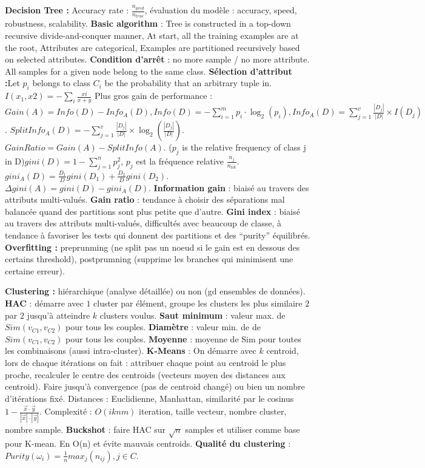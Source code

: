 \documentclass[9pt,a4paper]{report}
\begin{document}
\textbf{Decision Tree :} Accuracy rate : $\frac{n_{pred}}{n_{true}}$, évaluation du modèle : accuracy, speed, robustness, scalability. \textbf{Basic algorithm} : Tree is constructed in a top-down recursive divide-and-conquer manner, At start, all the training examples are at the root, Attributes are categorical, Examples are partitioned recursively based on selected attributes. \textbf{Condition d'arrêt} : no more sample / no more attribute. All samples for a given node belong to the same class. \textbf{Sélection d'attribut :}Let $p_i$ belongs to class $C_i$ be the probability that an arbitrary tuple in. $I(x_1, x2) = -\sum_i \frac{xi}{x+y}$ Plus gros gain de performance : $Gain(A)=Info(D)-Info_A(D), Info(D)=-\sum_{i=1}^mp_i\cdot\log_2(p_i), Info_A(D)=\sum_{j=1}^v\frac{|D_j|}{|D|}\times I(D_j)$. $SplitInfo_A(D)=-\sum_{j=1}^v\frac{|D_j|}{|D|}\times\log_2(\frac{|D_j|}{|D|})$. $GainRatio = Gain(A)-SplitInfo(A)$. ($p_j$ is the relative frequency of class j in D)$gini(D)=1-\sum_{j=1}^np^2_j$, $p_j$ est la fréquence relative $\frac{n_j}{n_{tot}}$. $gini_A(D)=\frac{D_1}{D}gini(D_1)+\frac{D_2}{D}gini(D_2)$. $\Delta gini(A)=gini(D)-gini_A(D)$.
\textbf{Information gain} : biaisé au travers des attributs multi-valués.
\textbf{Gain ratio} : tendance à choisir des séparations mal balancée quand des partitions sont plus petite que d’autre.
\textbf{Gini index} : biaisé au travers des attributs multi-valués, difficultés avec beaucoup de classe, à tendance à favoriser les tests qui donnent des partitions et des “purity” équilibrés.
\textbf{Overfitting :} preprunming (ne split pas un noeud si le gain est en dessous des certains threshold), postprumning (supprime les branches qui minimisent une certaine erreur).

\textbf{Clustering :} hiérarchique (analyse détaillée) ou non (gd ensembles de données). \textbf{HAC} : démarre avec $1$ cluster par élément, groupe les clusters les plus similaire $2$ par $2$ jusqu'à atteindre $k$ clusters voulus. \textbf{Saut minimum} : valeur max. de $Sim(v_{C1}, v_{C2})$ pour tous les couples. \textbf{Diamètre} : valeur min. de de $Sim(v_{C1}, v_{C2})$ pour tous les couples. \textbf{Moyenne} :  moyenne de Sim pour toutes les combinaisons (aussi intra-cluster). \textbf{K-Means} : On démarre avec $k$ centroid, lors de chaque itérations on fait : attribuer chaque point au centroid le plus proche, recalculer le centre des centroids (vecteurs moyen des distances aux centroid). Faire jusqu'à convergence (pas de centroid changé) ou bien un nombre d'itérations fixé. Distances : Euclidienne, Manhattan, similarité par le cosinus $1-\frac{\vec{x}\cdot\vec{y}}{|\vec{x}|\cdot|\vec{y}|}$. Complexité : $O(iknm)$ iteration, taille vecteur, nombre cluster, nombre sample. \textbf{Buckshot} : faire HAC sur $\sqrt{n}$ samples et utiliser comme base pour K-mean. En O(n) et évite mauvais centroids. \textbf{Qualité du clustering} : $Purity(\omega_i)=\frac{1}{n}max_j(n_{ij}), j\in C$.
\end{document}
